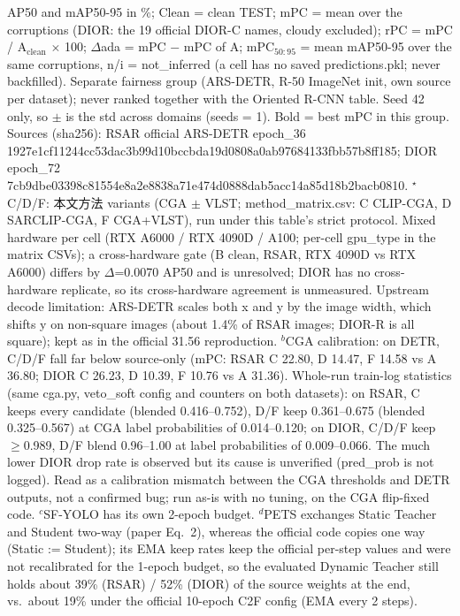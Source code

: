 \begin{table}[t]
\begin{tabular}{@{}l ccccc c ccccc@{}}
\bottomrule
\end{tabular}
\par\smallskip
\begin{minipage}{\textwidth}\scriptsize
AP50 and mAP50-95 in \%; Clean = clean TEST; mPC = mean over the corruptions (DIOR: the 19 official DIOR-C names, cloudy excluded); rPC = mPC / A$_{\mathrm{clean}}$ $\times$ 100; $\Delta$ada = mPC $-$ mPC of A; mPC$_{50:95}$ = mean mAP50-95 over the same corruptions, n/i = not\_inferred (a cell has no saved predictions.pkl; never backfilled). Separate fairness group (ARS-DETR, R-50 ImageNet init, own source per dataset); never ranked together with the Oriented R-CNN table. Seed 42 only, so $\pm$ is the std across domains (seeds = 1). Bold = best mPC in this group. Sources (sha256): RSAR official ARS-DETR epoch\_36 1927e1cf11244cc53dac3b99d10bccbda19d0808a0ab97684133fbb57b8ff185; DIOR epoch\_72 7cb9dbe03398c81554e8a2e8838a71e474d0888dab5acc14a85d18b2bacb0810. $^{\star}$C/D/F: 本文方法 variants (CGA $\pm$ VLST; method\_matrix.csv: C CLIP-CGA, D SARCLIP-CGA, F CGA+VLST), run under this table's strict protocol. Mixed hardware per cell (RTX A6000 / RTX 4090D / A100; per-cell gpu\_type in the matrix CSVs); a cross-hardware gate (B clean, RSAR, RTX 4090D vs RTX A6000) differs by $\Delta$=0.0070 AP50 and is unresolved; DIOR has no cross-hardware replicate, so its cross-hardware agreement is unmeasured. Upstream decode limitation: ARS-DETR scales both x and y by the image width, which shifts y on non-square images (about 1.4\% of RSAR images; DIOR-R is all square); kept as in the official 31.56 reproduction. $^{b}$CGA calibration: on DETR, C/D/F fall far below source-only (mPC: RSAR C 22.80, D 14.47, F 14.58 vs A 36.80; DIOR C 26.23, D 10.39, F 10.76 vs A 31.36). Whole-run train-log statistics (same cga.py, veto\_soft config and counters on both datasets): on RSAR, C keeps every candidate (blended 0.416--0.752), D/F keep 0.361--0.675 (blended 0.325--0.567) at CGA label probabilities of 0.014--0.120; on DIOR, C/D/F keep $\geq$0.989, D/F blend 0.96--1.00 at label probabilities of 0.009--0.066. The much lower DIOR drop rate is observed but its cause is unverified (pred\_prob is not logged). Read as a calibration mismatch between the CGA thresholds and DETR outputs, not a confirmed bug; run as-is with no tuning, on the CGA flip-fixed code. $^{c}$SF-YOLO has its own 2-epoch budget. $^{d}$PETS exchanges Static Teacher and Student two-way (paper Eq.~2), whereas the official code copies one way (Static := Student); its EMA keep rates keep the official per-step values and were not recalibrated for the 1-epoch budget, so the evaluated Dynamic Teacher still holds about 39\% (RSAR) / 52\% (DIOR) of the source weights at the end, vs.\ about 19\% under the official 10-epoch C2F config (EMA every 2 steps). 
\end{minipage}
\end{table}
